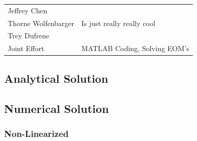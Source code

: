 \documentclass[12pt]{report}
\begin{document}
\begin{flushleft}
\onehalfspacing
\begin{tabular}{ll}
Jeffrey Chen & \\
Thorne Wolfenbarger & Is just really really cool\\
Trey Dufrene & \\
Joint Effort & MATLAB Coding, Solving EOM's
\end{tabular}
\singlespacing

\subsection{Analytical Solution}
\newpage
\subsection{Numerical Solution} \label{appendix:numerical}
\subsubsection{Non-Linearized}


\end{flushleft}
\end{document}
